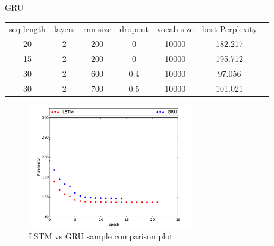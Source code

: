 \documentclass{article}
\begin{document}
GRU

\begin{center}
\begin{tabular}{c c c c c c c} 
seq length & layers & rnn size & dropout & vocab size & best Perplexity\\
 20 & 2 & 200 & 0 &  10000 & 182.217\\ 
 15 & 2 & 200 & 0 &  10000 & 195.712\\ 
 30 & 2 & 600 & 0.4 &  10000 & 97.056\\
 30 & 2 & 700 & 0.5 & 10000 & 101.021\\  
\end{tabular}
\end{center}

\begin{figure}[ht!]
  \centering
  \includegraphics[width=0.65\textwidth]{lstmvsgru}
  \caption{LSTM vs GRU sample comparison plot.\label{fig:gru_cell}}
\end{figure}
\end{document}

